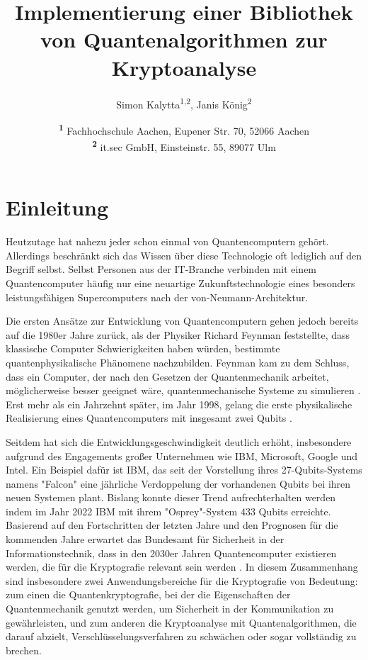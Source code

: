 \documentclass[
  a4paper, %
  10pt, %
  unnumberedsections, %
  twoside, %
]{LTJournalArticle}
\title{Implementierung einer Bibliothek von Quantenalgorithmen zur Kryptoanalyse} %
\author{%
  Simon Kalytta\textsuperscript{1,2}, Janis König\textsuperscript{2}
}
\date{%
  \footnotesize\textsuperscript{\textbf{1}}%
  Fachhochschule Aachen, 
  Eupener Str. 70, 52066 Aachen\\
  \textsuperscript{\textbf{2}}%
  it.sec GmbH,
  Einsteinstr. 55, 89077 Ulm%
}
\begin{document}
\maketitle %


\section{Einleitung}

Heutzutage hat nahezu jeder schon einmal von Quantencomputern gehört.
Allerdings beschränkt sich das Wissen über diese Technologie oft lediglich auf den Begriff selbst.
Selbst Personen aus der IT-Branche verbinden mit einem Quantencomputer häufig nur
eine neuartige Zukunftstechnologie eines besonders leistungsfähigen Supercomputers nach der von-Neumann-Architektur.

Die ersten Ansätze zur Entwicklung von Quantencomputern gehen jedoch bereits auf die 1980er Jahre zurück,
als der Physiker Richard Feynman feststellte,
dass klassische Computer Schwierigkeiten haben würden,
bestimmte quantenphysikalische Phänomene nachzubilden.
Feynman kam zu dem Schluss, dass ein Computer,
der nach den Gesetzen der Quantenmechanik arbeitet,
möglicherweise besser geeignet wäre,
quantenmechanische Systeme zu simulieren \autocite{Feynman:1982}.
Erst mehr als ein Jahrzehnt später, im Jahr 1998,
gelang die erste physikalische Realisierung eines Quantencomputers
mit insgesamt zwei Qubits \autocite{Chuang:1998ExperimentalIO}.

Seitdem hat sich die Entwicklungsgeschwindigkeit deutlich erhöht,
insbesondere aufgrund des Engagements großer Unternehmen wie IBM, Microsoft, Google und Intel.
Ein Beispiel dafür ist IBM,
das seit der Vorstellung ihres 27-Qubits-Systems namens "Falcon"
eine jährliche Verdoppelung der vorhandenen Qubits bei ihren neuen Systemen plant.
Bislang konnte dieser Trend aufrechterhalten werden
indem im Jahr 2022 IBM mit ihrem "Osprey"-System 433 Qubits erreichte\autocite{IBM:2022}.
Basierend auf den Fortschritten der letzten Jahre und
den Prognosen für die kommenden Jahre erwartet
das Bundesamt für Sicherheit in der Informationstechnik,
dass in den 2030er Jahren Quantencomputer existieren werden,
die für die Kryptografie relevant sein werden \autocite{BSI:2023}.
In diesem Zusammenhang sind insbesondere zwei Anwendungsbereiche für die Kryptografie von Bedeutung:
zum einen die Quantenkryptografie, bei der die Eigenschaften der Quantenmechanik genutzt werden,
um Sicherheit in der Kommunikation zu gewährleisten, und
zum anderen die Kryptoanalyse mit Quantenalgorithmen, die darauf abzielt,
Verschlüsselungsverfahren zu schwächen oder sogar vollständig zu brechen.
\end{document}
